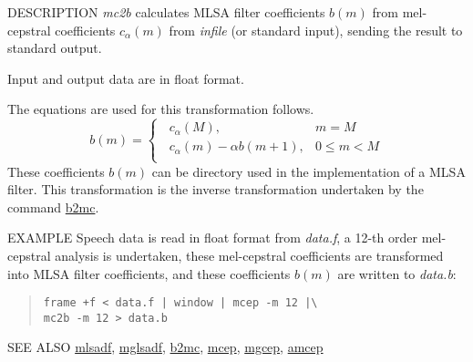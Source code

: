 \begin{synopsis}
 \item [mc2b] [ --a $A$ ] [ --m $M$ ] [ {\em infile} ]
\end{synopsis}

\begin{qsection}{DESCRIPTION}
{\em mc2b} calculates MLSA filter coefficients $b(m)$ 
from mel-cepstral coefficients $c_\alpha(m)$ 
from {\em infile} (or standard input), 
sending the result to standard output.

Input and output data are in float format.

The equations are used for this transformation follows.
\begin{displaymath}
b(m) = \begin{cases}
	  \;\; c_\alpha(M), & m=M \\
	  \;\; c_\alpha(m) - \alpha b(m+1), & 0 \leq m < M \\
	\end{cases}
\end{displaymath}
These coefficients $b(m)$ can be directory used in the
implementation of a MLSA filter.
This transformation is the inverse transformation undertaken
by the command \hyperlink{b2mc}{b2mc}.
\end{qsection}

\begin{options}
\end{options}

\begin{qsection}{EXAMPLE}
Speech data is read in float format from {\em data.f},
a 12-th order mel-cepstral analysis is undertaken,
these mel-cepstral coefficients are transformed into
MLSA filter coefficients, and these coefficients $b(m)$
are written to {\em data.b}:
\begin{quote}
 \verb!frame +f < data.f | window | mcep -m 12 |\ !\\
 \verb!mc2b -m 12 > data.b!
\end{quote} 
\end{qsection}

\begin{qsection}{SEE ALSO}
\hyperlink{mlsadf}{mlsadf},
\hyperlink{mglsadf}{mglsadf},
\hyperlink{b2mc}{b2mc},
\hyperlink{mcep}{mcep},
\hyperlink{mgcep}{mgcep},
\hyperlink{amcep}{amcep}
\end{qsection}
